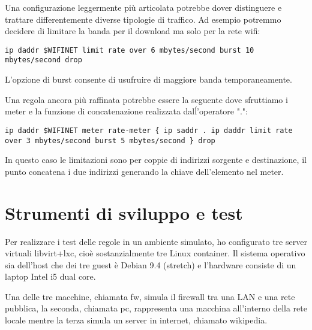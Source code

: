 Una configurazione leggermente pi\`u articolata potrebbe dover distinguere e
trattare differentemente diverse tipologie di traffico. Ad esempio potremmo
decidere di limitare la banda per il download ma solo per la rete wifi:
\begin{lstlisting}[style=customc,firstnumber=20]
ip daddr $WIFINET limit rate over 6 mbytes/second burst 10 mbytes/second drop
\end{lstlisting}
L'opzione di burst consente di usufruire di maggiore banda temporaneamente.

Una regola ancora pi\`u raffinata potrebbe essere la seguente dove sfruttiamo
i meter e la funzione di concatenazione realizzata dalĺ'operatore ".":
\begin{lstlisting}[style=customc,firstnumber=20]
ip daddr $WIFINET meter rate-meter { ip saddr . ip daddr limit rate over 3 mbytes/second burst 5 mbytes/second } drop
\end{lstlisting}
In questo caso le limitazioni sono per coppie di indirizzi sorgente e destinazione,
il punto concatena i due indirizzi generando la chiave dell'elemento nel meter.

\chapter{Strumenti di sviluppo e test}

Per realizzare i test delle regole in un ambiente simulato, ho configurato tre
server virtuali libvirt+lxc, cio\`e sostanzialmente tre Linux container.  Il
sistema operativo sia dell'host che dei tre guest \`e Debian 9.4 (stretch) e
l'hardware consiste di un laptop Intel i5 dual core.

Una delle tre macchine, chiamata fw, simula il firewall tra una LAN e una rete
pubblica, la seconda, chiamata pc, rappresenta una macchina all'interno della rete
locale mentre la terza simula un server in internet, chiamato wikipedia.

